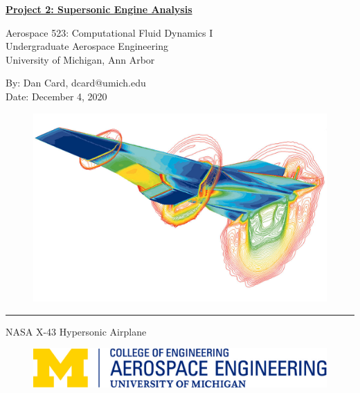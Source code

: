 \thispagestyle{empty}
\begin{center}
    \textbf{{\LARGE{\underline{Project 2: Supersonic Engine Analysis}}}}

    \vspace{0.25cm}
    Aerospace 523: Computational Fluid Dynamics I
    \\ Undergraduate Aerospace Engineering
    \\ University of Michigan, Ann Arbor
    
    \vspace{0.25cm}
    By: Dan Card, dcard@umich.edu
    \\ Date: December 4, 2020
\end{center}


\begin{figure}[h]
    \centering
    \includegraphics[width = \linewidth]{admin/cover.jpg}
\end{figure}
\begin{flushright}
    {\rule{2.5in}{1pt}}

    NASA X-43 Hypersonic Airplane 
\end{flushright}

\pagebreak
{
    \begin{figure}[h]
        \includegraphics[width=\linewidth]{admin/aero.jpg}
    \end{figure}

    \tableofcontents
    \pagebreak
    \listoffigures
    \listofmyequations
    \listoftables
    \lstlistoflistings
    \thispagestyle{empty}
}